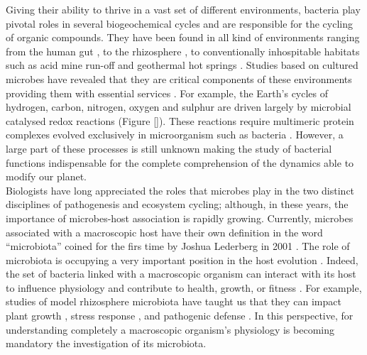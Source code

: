 Giving their ability to thrive in a vast set of different environments, bacteria play pivotal roles in several biogeochemical cycles and are responsible for the cycling of organic compounds. They have been found in all kind of environments ranging from the human gut \cite{walter2011human}, to the rhizosphere \cite{philippot2013going}, to conventionally inhospitable habitats such as acid mine run-off \cite{simmons2008population} and geothermal hot springs 	\cite{sharp2014humboldt}. Studies based on cultured microbes have revealed that they are critical components of these environments providing them with essential services \cite{van2008unseen, arrigo2004marine}. For example, the Earth's cycles of hydrogen, carbon, nitrogen, oxygen and sulphur are driven largely by microbial catalysed redox reactions (Figure \ref{}). These reactions require multimeric protein complexes evolved exclusively in microorganism such as bacteria \cite{falkowski2008microbial}. However, a large part of these processes is still unknown making the study of bacterial functions indispensable for the complete comprehension of the dynamics able to modify our planet.\\
Biologists have long appreciated the roles that microbes play in the two distinct disciplines of pathogenesis and ecosystem cycling; although, in these years, the importance of microbes-host association is rapidly growing. Currently, microbes associated with a macroscopic host have their own definition in the word ``microbiota'' coined for the firs time by Joshua Lederberg in 2001 \citep{lederberg2001scientist}. The role of microbiota is occupying a very important position in the host evolution \cite{ley2008evolution}. Indeed, the set of bacteria linked with a macroscopic organism can interact with its host to influence physiology and contribute to health, growth, or fitness \citep{dimkpa2009plant, hooper2012interactions}. For example, studies of model rhizosphere microbiota have taught us that they can impact plant growth \citep{kennedy2007competitive}, stress response \cite{redman2002thermotolerance, yang2009rhizosphere}, and pathogenic defense \cite{cook1995molecular}. In this perspective, for understanding completely a macroscopic organism’s physiology is becoming mandatory the investigation of its microbiota.\\
